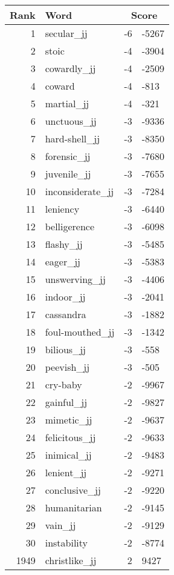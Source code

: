 \begin{longtable}[!htbp]{| rlr@{.}l |}
    \hline
    \textbf{Rank} & \textbf{Word} & \multicolumn{2}{c|}{\textbf{Score}} \\
    \hline
    \endhead
    1 & secular\_jj & -6 & -5267 \\
    2 & stoic & -4 & -3904 \\
    3 & cowardly\_jj & -4 & -2509 \\
    4 & coward & -4 & -813 \\
    5 & martial\_jj & -4 & -321 \\
    6 & unctuous\_jj & -3 & -9336 \\
    7 & hard-shell\_jj & -3 & -8350 \\
    8 & forensic\_jj & -3 & -7680 \\
    9 & juvenile\_jj & -3 & -7655 \\
    10 & inconsiderate\_jj & -3 & -7284 \\
    11 & leniency & -3 & -6440 \\
    12 & belligerence & -3 & -6098 \\
    13 & flashy\_jj & -3 & -5485 \\
    14 & eager\_jj & -3 & -5383 \\
    15 & unswerving\_jj & -3 & -4406 \\
    16 & indoor\_jj & -3 & -2041 \\
    17 & cassandra & -3 & -1882 \\
    18 & foul-mouthed\_jj & -3 & -1342 \\
    19 & bilious\_jj & -3 & -558 \\
    20 & peevish\_jj & -3 & -505 \\
    21 & cry-baby & -2 & -9967 \\
    22 & gainful\_jj & -2 & -9827 \\
    23 & mimetic\_jj & -2 & -9637 \\
    24 & felicitous\_jj & -2 & -9633 \\
    25 & inimical\_jj & -2 & -9483 \\
    26 & lenient\_jj & -2 & -9271 \\
    27 & conclusive\_jj & -2 & -9220 \\
    28 & humanitarian & -2 & -9145 \\
    29 & vain\_jj & -2 & -9129 \\
    30 & instability & -2 & -8774 \\
    1949 & christlike\_jj & 2 & 9427 \\

\end{longtable}
